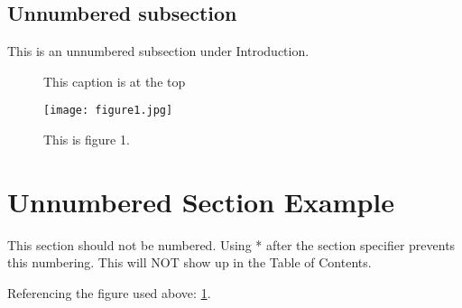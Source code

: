 \documentclass[14pt, a4paper]{article} %
\begin{document}
\pagebreak 

\subsection*{Unnumbered subsection}
This is an unnumbered subsection under Introduction. 
\begin{figure}[h]
	\centering
	\caption{This caption is at the top}
	\texttt{[image: figure1.jpg]}
	\label{fig:1}
	\caption{This is figure 1.}
\end{figure}


\section*{Unnumbered Section Example}
This section should not be numbered. Using * after the section specifier prevents this numbering. This will NOT show up in the Table of Contents. 

Referencing the figure used above: \ref{fig:1}.
\end{document}
